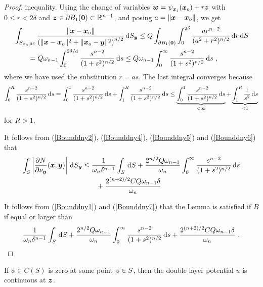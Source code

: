 \begin{proof}
inequality.  Using the change of variables
${\bm{w}} = \psi_{{\bm{x}}_j}({\bm{x}}_o) + r {\bm{z}}$ with $0 \leq r < 2\delta$
and ${\bm{z}} \in \partial B_1({\bm{0}}) \subset \mathbb{R}^{n-1}$, and posing
$a = \|{\bm{x}}-{\bm{x}}_o\|$, we get
\begin{align}
&\int_{S_{{\bm{x}}_o,2\delta}}
\frac{\left\|{\bm{x}}-{\bm{x}}_o\right\|}
{\left(\|{\bm{x}}-{\bm{x}}_o\|^2 + \|{\bm{x}}_o-{\bm{y}}\|^2\right)^{n/2}}
\,\mathrm{d}{S}_{{\bm{y}}}
\leq Q \int_{\partial B_1({\bm{0}})} \int_0^{2\delta}
\frac{a r^{n-2}}{(a^2 + r^2)^{n/2}} \,\mathrm{d}{r} \,\mathrm{d}{S} \nonumber \\
&\qquad
= Q \omega_{n-1} \int_0^{2\delta/a} \frac{s^{n-2}}{(1 + s^2)^{n/2}} \,\mathrm{d}{s} 
\leq Q \omega_{n-1} \int_0^{\infty} \frac{s^{n-2}}{(1 + s^2)^{n/2}} \,\mathrm{d}{s} \ ,
\label{Bounddny6}
\end{align}
where we have used the substitution $r = a s$.
The last integral converges because
\[
\int_0^R \frac{s^{n-2}}{(1 + s^2)^{n/2}} \,\mathrm{d}{s}
= \int_0^1 \frac{s^{n-2}}{(1 + s^2)^{n/2}} \,\mathrm{d}{s}
+ \int_1^R \frac{s^{n-2}}{(1 + s^2)^{n/2}} \,\mathrm{d}{s}
\leq \underbrace{\int_0^1 \frac{s^{n-2}}{(1 + s^2)^{n/2}} \,\mathrm{d}{s}}_{<\infty}
+ \underbrace{\int_1^R \frac{1}{s^2} \,\mathrm{d}{s}}_{<1}
\]
for $R >1$.

It follows from (\ref{Bounddny2}), (\ref{Bounddny4}),
(\ref{Bounddny5}) and (\ref{Bounddny6}) that
\begin{equation} \label{Bounddny7}
\begin{split}
\int_S
\left| \frac{\partial{N}}{\partial \nu_{{\bm{y}}}}({\bm{x}},{\bm{y}}) \right| \,\mathrm{d}{S}_{{\bm{y}}}
&\leq \frac{1}{\omega_n \delta^{n-1}} \int_S \,\mathrm{d}{S} 
+ \frac{2^{n/2}Q \omega_{n-1}}{\omega_n} 
\int_0^{\infty} \frac{s^{n-2}}{(1 + s^2)^{n/2}} \,\mathrm{d}{s} \\
&\qquad + \frac{2^{(n+2)/2} C Q \omega_{n-1} \delta}{\omega_n}
\end{split}
\end{equation}

 It follows from (\ref{Bounddny1}) and (\ref{Bounddny7})
that the Lemma is satisfied if $B$ if equal or larger than
\[
\frac{1}{\omega_n \delta^{n-1}} \int_S \,\mathrm{d}{S} 
+ \frac{2^{n/2}Q \omega_{n-1}}{\omega_n} 
\int_0^{\infty} \frac{s^{n-2}}{(1 + s^2)^{n/2}} \,\mathrm{d}{s}
+ \frac{2^{(n+2)/2} C Q \omega_{n-1} \delta}{\omega_n} \ . \qedhere
\]
\end{proof}

\begin{lemma} \label{pot_lem_dbl5}
If $\phi \in C(S)$ is zero at some point ${\bm{z}} \in S$, then the
double layer potential $u$ is continuous at ${\bm{z}}$.
\end{lemma}


